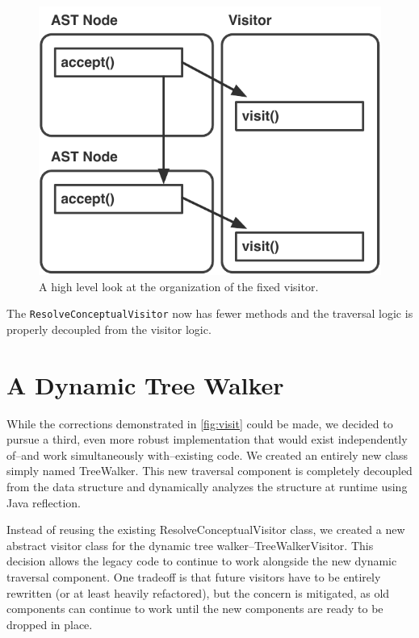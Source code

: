 \documentclass[times]{speauth}
\begin{document}
\begin{figure}[!htb]
\centering
\includegraphics[scale=.60]{figures/fixed_visitor_organization.pdf}
\caption{A high level look at the organization of the fixed visitor.}
\label{fig:flawedvisitororganization}
\end{figure}

The \texttt{ResolveConceptualVisitor} now has fewer methods and the traversal logic is properly decoupled from the visitor logic.


\section{A Dynamic Tree Walker}
While the corrections demonstrated in \ref{fig:visit} could be made, we decided to pursue a third, even more robust implementation that would exist independently of--and work simultaneously with--existing code. We created an entirely new class simply named TreeWalker. This new traversal component is completely decoupled from the data structure and dynamically analyzes the structure at runtime using Java reflection.

Instead of reusing the existing ResolveConceptualVisitor class, we created a new abstract visitor class for the dynamic tree walker--TreeWalkerVisitor. This decision allows the legacy code to continue to work alongside the new dynamic traversal component. One tradeoff is that future visitors have to be entirely rewritten (or at least heavily refactored), but the concern is mitigated, as old components can continue to work until the new components are ready to be dropped in place.
\end{document}
